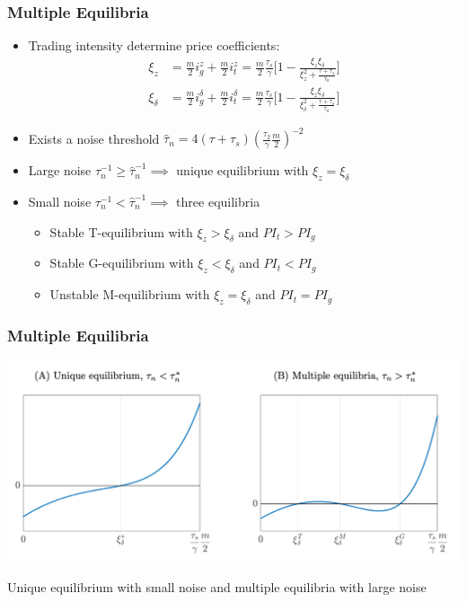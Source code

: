 \documentclass{beamer}
\begin{document}
\begin{frame}
\frametitle{Multiple Equilibria}
\begin{itemize}[<+->]
\item Trading intensity determine price coefficients:
\begin{align*}
\xi_z &= \frac{m}{2}i_g^z + \frac{m}{2}i_t^z = \frac{m}{2} \frac{\tau_s}{\gamma} \Bigg[1 - \frac{\xi_z \xi_\delta}{\xi_z^2 + \frac{\tau +\tau_s}{\tau_n}}\Bigg]\\
\xi_\delta &= \frac{m}{2}i_g^\delta + \frac{m}{2}i_t^\delta = \frac{m}{2} \frac{\tau_s}{\gamma} \Bigg[1 - \frac{\xi_z \xi_\delta}{\xi_\delta^2 + \frac{\tau +\tau_s}{\tau_n}}\Bigg]
\end{align*}
\bigskip
\item Exists a noise threshold $\hat{\tau}_n = 4(\tau + \tau_s) (\frac{\tau_2}{\gamma}\frac{m}{2})^{-2}$
\bigskip
\item  Large noise $\tau_n^{-1} \ge \hat\tau_n^{-1} \implies$ unique equilibrium with $\xi_z = \xi_\delta$
\bigskip
\item Small noise $\tau_n^{-1} < \hat\tau_n^{-1} \implies$ three equilibria
\begin{itemize}[<+->]
\item Stable T-equilibrium with $\xi_z > \xi_\delta$ and $PI_t > PI_g$
\item Stable G-equilibrium with $\xi_z < \xi_\delta$ and $PI_t < PI_g$
\item Unstable M-equilibrium with $\xi_z = \xi_\delta$ and $PI_t = PI_g$
\end{itemize}
\end{itemize}
\end{frame}


\begin{frame}
\frametitle{Multiple Equilibria}
\begin{center}
\includegraphics[scale=0.35]{multiple_equilibria}
\end{center}
Unique equilibrium with small noise and multiple equilibria with large noise
\end{frame}
\end{document}
